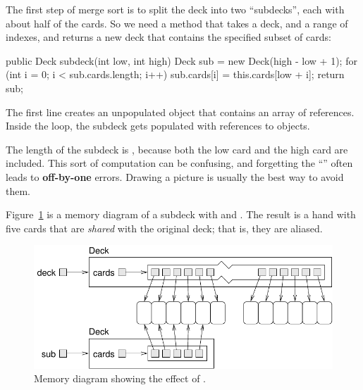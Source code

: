 \label{subdeck}

The first step of merge sort is to split the deck into two ``subdecks'', each with about half of the cards.
So we need a method that takes a deck, and a range of indexes, and returns a new deck that contains the specified subset of cards:

\begin{code}
public Deck subdeck(int low, int high) {
    Deck sub = new Deck(high - low + 1);
    for (int i = 0; i < sub.cards.length; i++) {
        sub.cards[i] = this.cards[low + i];
    }
    return sub;
}
\end{code}

The first line creates an unpopulated  object that contains an array of  references.
Inside the  loop, the subdeck gets populated with references to  objects.


The length of the subdeck is , because both the low card and the high card are included.
This sort of computation can be confusing, and forgetting the ``'' often leads to {\bf off-by-one} errors.
Drawing a picture is usually the best way to avoid them.

%


Figure~\ref{fig.subdeck} is a memory diagram of a subdeck with  and .
The result is a hand with five cards that are {\em shared} with the original deck; that is, they are aliased.

\begin{figure}[!ht]
\begin{center}
\includegraphics{figs/subdeck.pdf}
\caption{Memory diagram showing the effect of .}
\label{fig.subdeck}
\end{center}
\end{figure}


